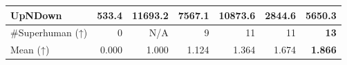 \begin{table}[h]
{\begin{tabular}{lrrrrrr}
UpNDown              &  533.4     &  11693.2   &  7567.1           &  \textbf{10873.6}   &  2844.6                   &  5650.3              \\
\midrule
\#Superhuman (↑)     &  0         &  N/A       &  9                &  11                 &  11                       &  \textbf{13}         \\
Mean (↑)             &  0.000     &  1.000     &  1.124            &  1.364              &  1.674                   &  \textbf{1.866}      \\
  \end{tabular}}
\end{table}

